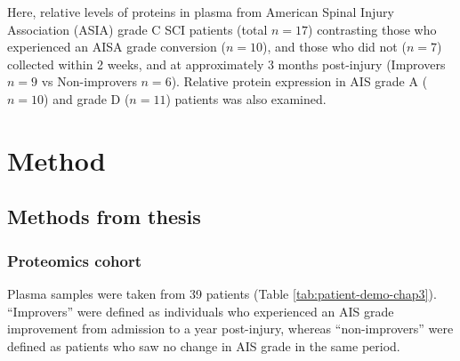 \documentclass[
]{article}
\begin{document}
Here, relative levels of proteins in plasma from American Spinal Injury Association (ASIA) grade C SCI patients (total \(n = 17\)) contrasting those who experienced an AISA grade conversion (\(n = 10\)), and those who did not (\(n = 7\)) collected within 2 weeks, and at approximately 3 months post-injury (Improvers \(n = 9\) vs Non-improvers \(n = 6\)).
Relative protein expression in AIS grade A (\(n = 10\)) and grade D (\(n = 11\)) patients was also examined.

\hypertarget{method}{%
\section{Method}\label{method}}

\hypertarget{methods-from-thesis}{%
\subsection{Methods from thesis}\label{methods-from-thesis}}

\hypertarget{itraq-patient-demo}{%
\subsubsection{Proteomics cohort}\label{itraq-patient-demo}}

Plasma samples were taken from 39 patients (Table \ref{tab:patient-demo-chap3}).
``Improvers'' were defined as individuals who experienced an AIS grade improvement from admission to a year post-injury, whereas ``non-improvers'' were defined as patients who saw no change in AIS grade in the same period.
\end{document}
